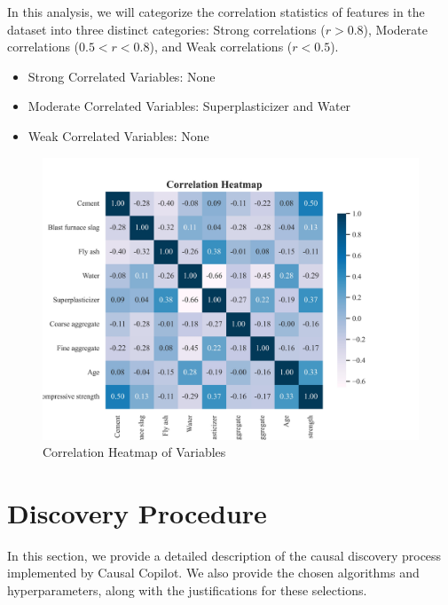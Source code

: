 \documentclass{article}
\begin{document}
\begin{minipage}[t]{0.5\linewidth}
    In this analysis, we will categorize the correlation statistics of features in the dataset into three distinct categories: Strong correlations ($r>0.8$), Moderate correlations ($0.5<r<0.8$), and Weak correlations ($r<0.5$).

\begin{itemize}
\item Strong Correlated Variables: None
\item Moderate Correlated Variables: Superplasticizer and Water
\item Weak Correlated Variables: None
\end{itemize}
\vfill
\end{minipage}
\hfill
\begin{minipage}[t]{0.5\linewidth}
    \begin{figure}[H]
        \centering
        \vspace{-1.5cm}
        \includegraphics[width=\linewidth]{dataset/CCS_Data/output_graph/eda_corr.jpg}
        \caption{\label{fig:corr}Correlation Heatmap of Variables}
    \end{figure}
\end{minipage}

\section{Discovery Procedure}

In this section, we provide a detailed description of the causal discovery process implemented by Causal Copilot. 
We also provide the chosen algorithms and hyperparameters, along with the justifications for these selections.
\end{document}
